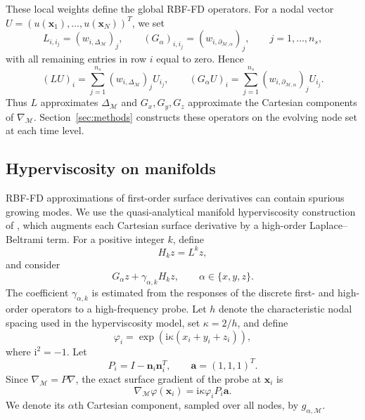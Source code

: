 \documentclass[a4paper,fleqn]{cas-sc}
\begin{document}
These local weights define the global RBF-FD operators.  For a nodal vector
$U=(u(\bm x_1),\ldots,u(\bm x_N))^T$, we set
\begin{equation}
  L_{i,i_j}=(w_{i,\Delta_{\mathcal M}})_j,
  \qquad
  (G_\alpha)_{i,i_j}=(w_{i,\partial_{\mathcal M,\alpha}})_j,
  \qquad j=1,\ldots,n_s,
  \label{eq:tp-global-operator-entries}
\end{equation}
with all remaining entries in row $i$ equal to zero.  Hence
\begin{equation}
  (LU)_i
  =
  \sum_{j=1}^{n_s}(w_{i,\Delta_{\mathcal M}})_j U_{i_j},
  \qquad
  (G_\alpha U)_i
  =
  \sum_{j=1}^{n_s}(w_{i,\partial_{\mathcal M,\alpha}})_j U_{i_j}.
  \label{eq:tp-global-operator-action}
\end{equation}
Thus $L$ approximates $\Delta_{\mathcal M}$ and
$G_x,G_y,G_z$ approximate the Cartesian components of $\nabla_{\mathcal M}$.
Section~\ref{sec:methods} constructs these operators on the evolving node set
at each time level.

\subsection{Hyperviscosity on manifolds}
\label{subsec:overview-hyperviscosity}

RBF-FD approximations of first-order surface derivatives can contain spurious
growing modes.  We use the quasi-analytical manifold hyperviscosity
construction of \cite{ShankarWrightNarayan2020}, which augments each Cartesian
surface derivative by a high-order Laplace--Beltrami term.  For a positive
integer $k$, define
\begin{equation}
  H_k z=L^kz,
  \label{eq:hv-poly-laplacian}
\end{equation}
and consider
\[
  G_\alpha z+\gamma_{\alpha,k}H_k z,
  \qquad \alpha\in\{x,y,z\}.
\]
The coefficient $\gamma_{\alpha,k}$ is estimated from the responses of the
discrete first- and high-order operators to a high-frequency probe. Let $h$ denote the characteristic nodal spacing used in the hyperviscosity
model, set $\kappa=2/h$, and define
\begin{equation}
  \varphi_i
  =
  \exp\!\left(\mathrm{i}\kappa(x_i+y_i+z_i)\right),
  \label{eq:hv-probe}
\end{equation}
where $\mathrm{i}^2=-1$.  Let
\[
  P_i=I-\bm n_i\bm n_i^T,
  \qquad
  \bm a=(1,1,1)^T.
\]
Since $\nabla_{\mathcal M}=P\nabla$, the exact surface gradient of the probe at
$\bm x_i$ is
\begin{equation}
  \nabla_{\mathcal M}\varphi(\bm x_i)
  =
  \mathrm{i}\kappa\varphi_i P_i\bm a.
  \label{eq:hv-exact-surface-gradient}
\end{equation}
We denote its $\alpha$th Cartesian component, sampled over all nodes, by
$g_{\alpha,\mathcal M}$.
\end{document}
